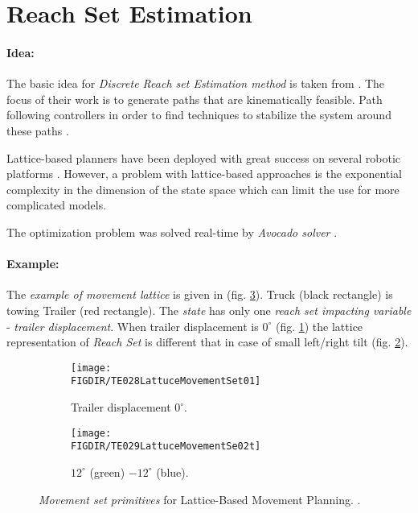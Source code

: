 \section{Reach Set Estimation}\label{s:ReachSetEstimationTheory}
\paragraph{Idea:} The basic idea for \emph{Discrete Reach set Estimation  method} is taken from \cite{ljungqvist2017lattice}. The focus of their work is to generate paths that are kinematically feasible. Path following controllers in order to find techniques to stabilize the system around these paths \cite{ljungqvist2016path,evestedt2016path}. 

Lattice-based planners have been deployed with great success on several robotic platforms \cite{pivtoraiko2009differentially,urmson2008william,cirillo2017videogames,tomlin2000game,chen1997game}. However, a problem with lattice-based approaches is the exponential complexity in the dimension of the state space which can limit the use for more complicated models.

The optimization problem was solved real-time by \emph{Avocado solver} \cite{houska2011acado}.

\paragraph{Example:} The \emph{example of movement lattice} is given in (fig. \ref{fig:latticeMovementPrimitivesExample}). Truck (black rectangle) is towing Trailer (red rectangle). The \emph{state} has only one \emph{reach set impacting variable} - \emph{trailer displacement}. When trailer displacement is $0^{\circ}$ (fig. \ref{fig:noDisplacementLattuce}) the lattice representation of \emph{Reach Set} is different that in case of small left/right tilt (fig. \ref{fig:displacementleftrightlattuce}).

\begin{figure}[H]
    \centering
    \begin{subfigure}{0.48\textwidth}
        \centering
        \texttt{[image: \\FIGDIR/TE028LattuceMovementSet01]}
        \caption{Trailer displacement $0^{\circ}$.}
        \label{fig:noDisplacementLattuce}
    \end{subfigure}
    \begin{subfigure}{0.48\textwidth}
        \centering
        \texttt{[image: \\FIGDIR/TE029LattuceMovementSe02t]} 
        \caption{$12^{\circ}$ (green) $-12^{\circ}$ (blue).}
        \label{fig:displacementleftrightlattuce}
    \end{subfigure}
    
    \caption{\emph{Movement set primitives} for Lattice-Based Movement Planning. \cite{ljungqvist2017lattice}. }
    \label{fig:latticeMovementPrimitivesExample}
\end{figure}

